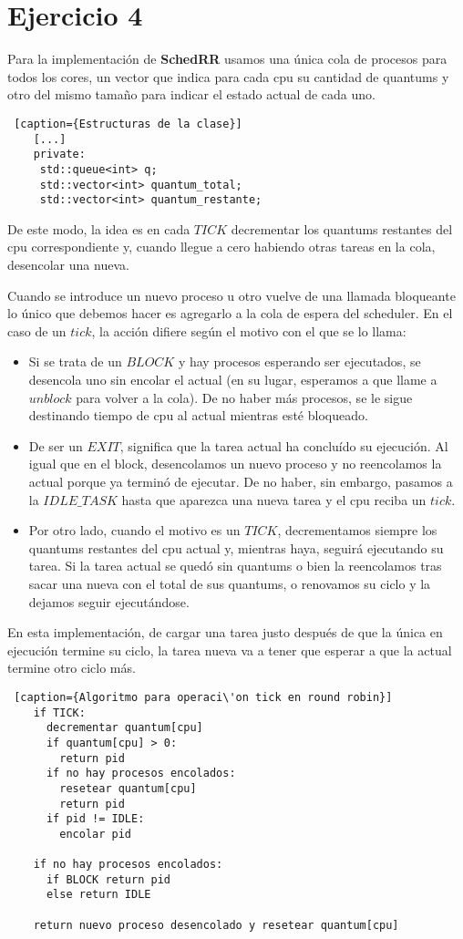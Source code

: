 \section{Ejercicio 4}

Para la implementación de \textbf{SchedRR} usamos una única cola de procesos para todos los cores, un vector que indica para cada cpu su cantidad de quantums y otro del mismo tamaño para indicar el estado actual de cada uno.
  \begin{lstlisting} [caption={Estructuras de la clase}]
    [...]
    private:
     std::queue<int> q;
     std::vector<int> quantum_total;
     std::vector<int> quantum_restante;
  \end{lstlisting}

De este modo, la idea es en cada $TICK$ decrementar los quantums restantes del cpu correspondiente y, cuando llegue a cero habiendo otras tareas en la cola, desencolar una nueva.

Cuando se introduce un nuevo proceso u otro vuelve de una llamada bloqueante lo único que debemos hacer es agregarlo a la cola de espera del scheduler.
En el caso de un $tick$, la acción difiere según el motivo con el que se lo llama:

  \begin{itemize}
    \item Si se trata de un $BLOCK$ y hay procesos esperando ser ejecutados, se desencola uno sin encolar el actual (en su lugar, esperamos a que llame a $unblock$ para volver a la cola). De no haber más procesos, se le sigue destinando tiempo de cpu al actual mientras esté bloqueado.
    \item De ser un $EXIT$, significa que la tarea actual ha concluído su ejecución. Al igual que en el block, desencolamos un nuevo proceso y no reencolamos la actual porque ya terminó de ejecutar. De no haber, sin embargo, pasamos a la $IDLE\_TASK$ hasta que aparezca una nueva tarea y el cpu reciba un $tick$.
    \item Por otro lado, cuando el motivo es un $TICK$, decrementamos siempre los quantums restantes del cpu actual y, mientras haya, seguirá ejecutando su tarea. Si la tarea actual se quedó sin quantums o bien la reencolamos tras sacar una nueva con el total de sus quantums, o renovamos su ciclo y la dejamos seguir ejecutándose.
  \end{itemize}

En esta implementación, de cargar una tarea justo después de que la única en ejecución termine su ciclo, la tarea nueva va a tener que esperar a que la actual termine otro ciclo más.

  \begin{lstlisting} [caption={Algoritmo para operaci\'on tick en round robin}]
    if TICK:
      decrementar quantum[cpu]
      if quantum[cpu] > 0:
        return pid
      if no hay procesos encolados:
        resetear quantum[cpu]
        return pid
      if pid != IDLE:
        encolar pid

    if no hay procesos encolados:
      if BLOCK return pid
      else return IDLE

    return nuevo proceso desencolado y resetear quantum[cpu]
  \end{lstlisting}
